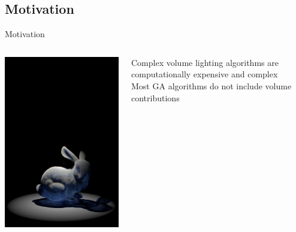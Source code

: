 \documentclass[10pt,compress,professionalfont]{beamer}
\begin{document}
\subsection{Motivation}
\begin{frame}{Motivation}

    \begin{columns}
        \begin{column}{0.35\textwidth}
            {\centering \includegraphics[width=\textwidth]{../img/bunny_spot_sad}\\}

        \end{column}
        \begin{column}{0.65\textwidth}
            Complex volume lighting algorithms are computationally expensive and complex\\
            \vspace{8mm}
            Most GA algorithms do not include volume contributions\\
            
        \end{column}
    \end{columns}
\end{frame}
\end{document}

